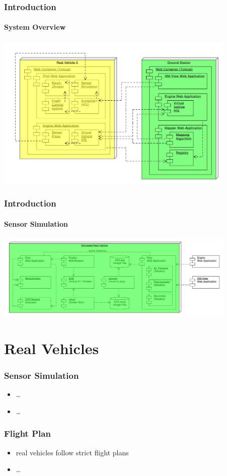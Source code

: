 \documentclass{beamer}
\begin{document}
\begin{frame}\frametitle{Introduction}\framesubtitle{System Overview}
	{\includegraphics[width=11.5cm]{SystemOverview.pdf}}
\end{frame}

\begin{frame}\frametitle{Introduction}\framesubtitle{Sensor Simulation}
	{\includegraphics[width=11.5cm]{SensorSimulation.pdf}}
\end{frame}

\section{Real Vehicles}

\begin{frame}\frametitle{Sensor Simulation} %
	\begin{itemize}
		\item \ldots
		\item \ldots
	\end{itemize} 
\end{frame}

\begin{frame}\frametitle{Flight Plan} %
	\begin{itemize}
		\item real vehicles follow strict flight plans
		\item \ldots
	\end{itemize} 
\end{frame}
\end{document}
